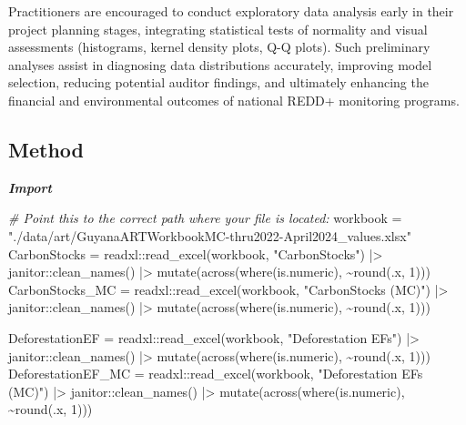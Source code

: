 \documentclass[
]{article}
\newenvironment{Shaded}{}{}
\newcommand{\CommentTok}[1]{\textcolor[rgb]{0.38,0.63,0.69}{\textit{#1}}}
\newcommand{\DecValTok}[1]{\textcolor[rgb]{0.25,0.63,0.44}{#1}}
\newcommand{\FunctionTok}[1]{\textcolor[rgb]{0.02,0.16,0.49}{#1}}
\newcommand{\NormalTok}[1]{#1}
\newcommand{\OtherTok}[1]{\textcolor[rgb]{0.00,0.44,0.13}{#1}}
\newcommand{\SpecialCharTok}[1]{\textcolor[rgb]{0.25,0.44,0.63}{#1}}
\newcommand{\StringTok}[1]{\textcolor[rgb]{0.25,0.44,0.63}{#1}}
\begin{document}
Practitioners are encouraged to conduct exploratory data analysis early
in their project planning stages, integrating statistical tests of
normality and visual assessments (histograms, kernel density plots, Q-Q
plots). Such preliminary analyses assist in diagnosing data
distributions accurately, improving model selection, reducing potential
auditor findings, and ultimately enhancing the financial and
environmental outcomes of national REDD+ monitoring programs.

\subsection{Method}\label{method}

\textbf{\emph{Import}}

\begin{Shaded}
\begin{Highlighting}[numbers=left,,]
\CommentTok{\# Point this to the correct path where your file is located:}
\NormalTok{workbook }\OtherTok{=} \StringTok{"./data/art/GuyanaARTWorkbookMC{-}thru2022{-}April2024\_values.xlsx"}
\NormalTok{CarbonStocks }\OtherTok{=}\NormalTok{ readxl}\SpecialCharTok{::}\FunctionTok{read\_excel}\NormalTok{(workbook, }\StringTok{"CarbonStocks"}\NormalTok{) }\SpecialCharTok{|\textgreater{}}
\NormalTok{    janitor}\SpecialCharTok{::}\FunctionTok{clean\_names}\NormalTok{() }\SpecialCharTok{|\textgreater{}}
    \FunctionTok{mutate}\NormalTok{(}\FunctionTok{across}\NormalTok{(}\FunctionTok{where}\NormalTok{(is.numeric), }\SpecialCharTok{\textasciitilde{}}\FunctionTok{round}\NormalTok{(.x, }\DecValTok{1}\NormalTok{)))}
\NormalTok{CarbonStocks\_MC }\OtherTok{=}\NormalTok{ readxl}\SpecialCharTok{::}\FunctionTok{read\_excel}\NormalTok{(workbook, }\StringTok{"CarbonStocks (MC)"}\NormalTok{) }\SpecialCharTok{|\textgreater{}}
\NormalTok{    janitor}\SpecialCharTok{::}\FunctionTok{clean\_names}\NormalTok{() }\SpecialCharTok{|\textgreater{}}
    \FunctionTok{mutate}\NormalTok{(}\FunctionTok{across}\NormalTok{(}\FunctionTok{where}\NormalTok{(is.numeric), }\SpecialCharTok{\textasciitilde{}}\FunctionTok{round}\NormalTok{(.x, }\DecValTok{1}\NormalTok{)))}

\NormalTok{DeforestationEF }\OtherTok{=}\NormalTok{ readxl}\SpecialCharTok{::}\FunctionTok{read\_excel}\NormalTok{(workbook, }\StringTok{"Deforestation EFs"}\NormalTok{) }\SpecialCharTok{|\textgreater{}}
\NormalTok{    janitor}\SpecialCharTok{::}\FunctionTok{clean\_names}\NormalTok{() }\SpecialCharTok{|\textgreater{}}
    \FunctionTok{mutate}\NormalTok{(}\FunctionTok{across}\NormalTok{(}\FunctionTok{where}\NormalTok{(is.numeric), }\SpecialCharTok{\textasciitilde{}}\FunctionTok{round}\NormalTok{(.x, }\DecValTok{1}\NormalTok{)))}
\NormalTok{DeforestationEF\_MC }\OtherTok{=}\NormalTok{ readxl}\SpecialCharTok{::}\FunctionTok{read\_excel}\NormalTok{(workbook, }\StringTok{"Deforestation EFs (MC)"}\NormalTok{) }\SpecialCharTok{|\textgreater{}}
\NormalTok{    janitor}\SpecialCharTok{::}\FunctionTok{clean\_names}\NormalTok{() }\SpecialCharTok{|\textgreater{}}
    \FunctionTok{mutate}\NormalTok{(}\FunctionTok{across}\NormalTok{(}\FunctionTok{where}\NormalTok{(is.numeric), }\SpecialCharTok{\textasciitilde{}}\FunctionTok{round}\NormalTok{(.x, }\DecValTok{1}\NormalTok{)))}


\end{Highlighting}
\end{Shaded}
\end{document}
